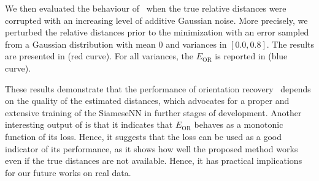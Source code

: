 We then evaluated the behaviour of~ when the true relative distances were corrupted with an increasing level of additive Gaussian noise. More precisely, we perturbed the relative distances prior to the minimization with an error sampled from a Gaussian distribution with mean 0 and variances in $[0.0, 0.8]$.
The results are presented in  (red curve).
For all variances, the $E_\text{OR}$ is reported in  (blue curve).


These results demonstrate that the performance of orientation recovery~ depends on the quality of the estimated distances, which advocates for a proper and extensive training of the SiameseNN in further stages of development.
Another interesting output of  is that it indicates that $E_\text{OR}$ behaves as a monotonic function of its loss.
Hence, it suggests that the loss can be used as a good indicator of its performance, as it shows how well the proposed method works even if the true distances are not available.
Hence, it has practical implications for our future works on real data.

